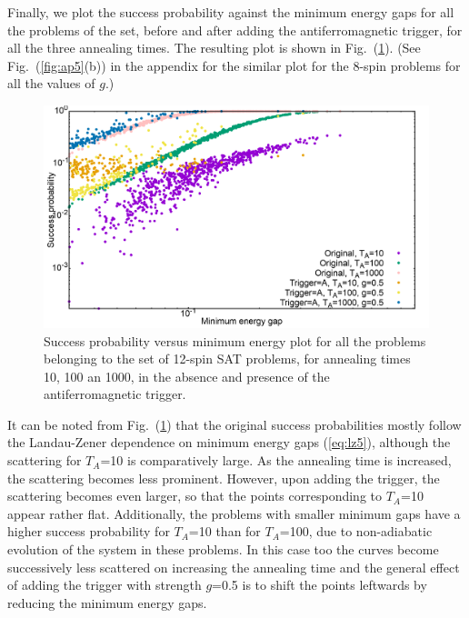 \documentclass[../main.tex]{subfiles}
\begin{document}
Finally, we plot the success probability against the minimum energy gaps for all the problems of the set, before and after adding the antiferromagnetic trigger, for all the three annealing times. The resulting plot is shown in Fig.~(\ref{fig:a17}). (See Fig.~(\ref{fig:ap5}(b)) in the appendix for the similar plot for the 8-spin problems for all the values of $g$.)

\begin{figure}
\centering 
\includegraphics[scale=0.24]{SuccVsGap_OA_g0.png}
\caption{Success probability versus minimum energy plot for all the problems belonging to the set of 12-spin SAT problems, for annealing times 10, 100 an 1000, in the absence and presence of the  antiferromagnetic trigger.}
\label{fig:a17}
\end{figure}


It can be noted from Fig.~(\ref{fig:a17}) that the original success probabilities mostly follow the Landau-Zener dependence on minimum energy gaps (\ref{eq:lz5}), although the scattering for $T_A$=10 is comparatively large. As the annealing time is increased, the scattering becomes less prominent. However, upon adding the trigger, the scattering becomes even larger, so that the points corresponding to $T_A$=10 appear rather flat. Additionally, the problems with smaller minimum gaps have a higher success probability for $T_A$=10 than for $T_A$=100, due to non-adiabatic evolution of the system in these problems. In this case too the curves become successively less scattered on increasing the annealing time and the general effect of adding the trigger with strength $g$=0.5 is to shift the points leftwards by reducing the minimum energy gaps.
\newpage
\end{document}
